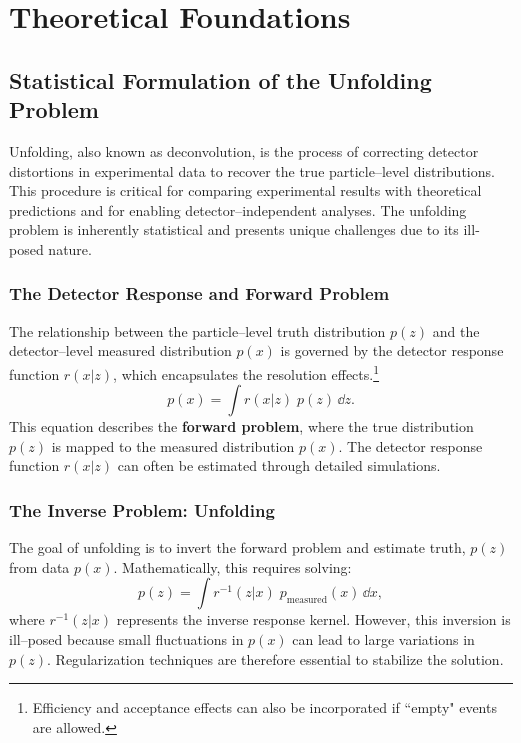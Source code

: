 \chapter{Theoretical Foundations}
\label{chap:theoretical-foundations}
\section{Statistical Formulation of the Unfolding Problem}

Unfolding, also known as deconvolution, is the process of correcting detector distortions in experimental data to recover the true particle--level distributions.
%
This procedure is critical for comparing experimental results with theoretical predictions and for enabling detector--independent analyses.
%
The unfolding problem is inherently statistical and presents unique challenges due to its ill-posed nature.

\subsection{The Detector Response and Forward Problem}

The relationship between the particle--level truth distribution \(p(z)\) and the detector--level measured distribution \(p(x)\) is governed by the detector response function \(r(x|z)\), which encapsulates the resolution effects.\footnote{Efficiency and acceptance effects can also be incorporated if ``empty" events are allowed.}
\begin{equation}
    p(x) = \int r(x|z)\; p(z) \, \dd z.
\end{equation}
This equation describes the \textbf{forward problem}, where the true distribution \(p(z)\) is mapped to the measured distribution \(p(x)\).
%
The detector response function \(r(x|z)\) can often be estimated through detailed simulations.

\subsection{The Inverse Problem: Unfolding}

The goal of unfolding is to invert the forward problem and estimate truth, \(p(z)\) from data \(p(x)\).
%
Mathematically, this requires solving:
\begin{equation}
    p(z) = \int r^{-1}(z|x) \;p_{\text{measured}}(x) \, \dd x,
\end{equation}
where \(r^{-1}(z|x)\) represents the inverse response kernel.
%
However, this inversion is ill--posed because small fluctuations in \(p(x)\) can lead to large variations in \(p(z)\).
%
Regularization techniques are therefore essential to stabilize the solution.


